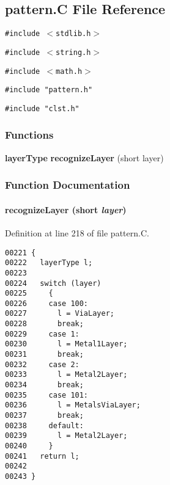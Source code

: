 \subsection{pattern.C File Reference}
\label{pattern.C}
{\tt \#include $<$stdlib.h$>$}\par
{\tt \#include $<$string.h$>$}\par
{\tt \#include $<$math.h$>$}\par
{\tt \#include "pattern.h"}\par
{\tt \#include "clst.h"}\par
\subsubsection*{Functions}
\begin{CompactItemize}
\item 
{\bf layer\-Type} {\bf recognize\-Layer} (short layer)
\end{CompactItemize}


\subsubsection{Function Documentation}
\label{pattern.C_a0}
\paragraph{ recognize\-Layer (short {\em layer})}\hfill



Definition at line 218 of file pattern.C.\small\begin{verbatim}00221 {
00222   layerType l;
00223 
00224   switch (layer)
00225     {
00226     case 100:
00227       l = ViaLayer;
00228       break;
00229     case 1:
00230       l = Metal1Layer;  
00231       break;
00232     case 2:
00233       l = Metal2Layer;  
00234       break;
00235     case 101:
00236       l = MetalsViaLayer;  
00237       break;
00238     default:
00239       l = Metal2Layer;
00240     }
00241   return l;
00242 
00243 }
\end{verbatim}\normalsize 
